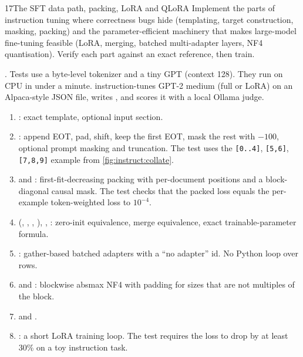 \begin{labbox}{17}{The SFT data path, packing, LoRA and QLoRA}
Implement the parts of instruction tuning where correctness bugs hide (templating,
target construction, masking, packing) and the parameter-efficient machinery that
makes large-model fine-tuning feasible (LoRA, merging, batched multi-adapter layers,
NF4 quantisation). Verify each part against an exact reference, then train.

.
Tests use a byte-level tokenizer and a tiny GPT (context 128). They run on CPU in under
a minute.  instruction-tunes GPT-2 medium (full or LoRA) on an Alpaca-style
JSON file, writes , and scores it with a local Ollama judge.

\begin{enumerate}
\item {}: exact template, optional input section.
\item {}: append EOT, pad, shift, keep the first EOT, mask the
rest with $-100$, optional prompt masking and truncation. The test uses the
\texttt{[0..4]}, \texttt{[5,6]}, \texttt{[7,8,9]} example from
\cref{fig:instruct:collate}.
\item {} and : first-fit-decreasing packing with
per-document positions and a block-diagonal causal mask. The test checks that the
packed loss equals the per-example token-weighted loss to $10^{-4}$.
\item {} (, , ,
), , : zero-init equivalence,
merge equivalence, exact trainable-parameter formula.
\item {}: gather-based batched adapters with a ``no adapter''
id. No Python loop over rows.
\item {} and : blockwise absmax NF4 with padding
for sizes that are not multiples of the block.
\item {} and .
\item {}: a short LoRA training loop. The test requires the loss to drop by
at least 30\% on a toy instruction task.
\end{enumerate}


\end{labbox}

